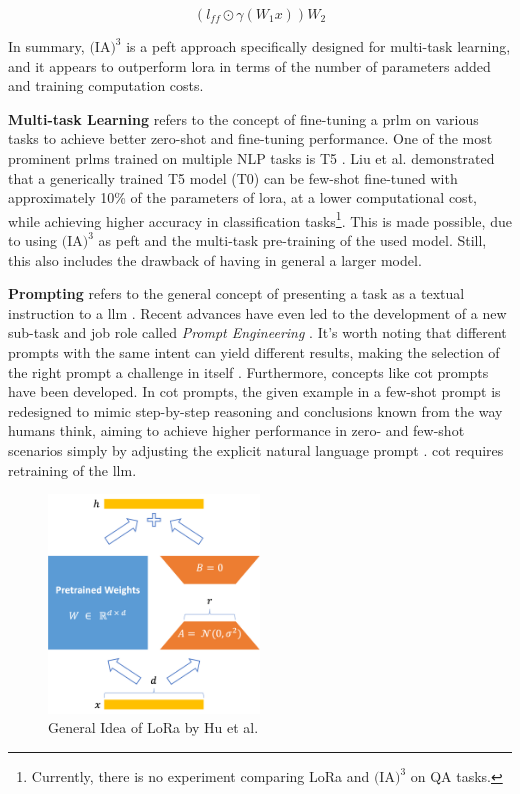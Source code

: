 \begin{equation}
    (l_{ff} \odot \gamma (W_1x))W_2
\end{equation}

In summary, \textbf{$\text{(IA)}^3$} is a \gls{peft} approach specifically designed for multi-task learning, and it appears to outperform \gls{lora} in terms of the number of parameters added and training computation costs.

\textbf{Multi-task Learning} refers to the concept of fine-tuning a \gls{prlm} on various tasks to achieve better zero-shot and fine-tuning performance. One of the most prominent \gls{prlm}s trained on multiple NLP tasks is T5 \cite{raffel_exploring_2023}. Liu et al. \cite{liu_few-shot_2022} demonstrated that a generically trained T5 model (T0) can be few-shot fine-tuned with approximately 10\% of the parameters of \gls{lora}, at a lower computational cost, while achieving higher accuracy in classification tasks\footnote{Currently, there is no experiment comparing LoRa and $\text{(IA)}^3$ on QA tasks.}. This is made possible, due to using $\text{(IA)}^3$ as \gls{peft} and the multi-task pre-training of the used model. Still, this also includes the drawback of having in general a larger model.

\textbf{Prompting} refers to the general concept of presenting a task as a textual instruction to a \gls{llm} \cite{brown_language_2020}. Recent advances have even led to the development of a new sub-task and job role called \textit{Prompt Engineering} \cite{white_prompt_2023}. It's worth noting that different prompts with the same intent can yield different results, making the selection of the right prompt a challenge in itself \cite{liu_gpt_2021}. Furthermore, concepts like \gls{cot} prompts have been developed. In \gls{cot} prompts, the given example in a few-shot prompt is redesigned to mimic step-by-step reasoning and conclusions known from the way humans think, aiming to achieve higher performance in zero- and few-shot scenarios simply by adjusting the explicit natural language prompt \cite{wei_chain--thought_2023}. \gls{cot} requires retraining of the \gls{llm}.

\begin{figure}
    \centering
    \includegraphics[width=0.5\textwidth]{Grafiken/Lora.png}
    \caption{General Idea of LoRa by Hu et al. \cite{hu_lora_nodate}}
    \label{fig:lora}
\end{figure}


